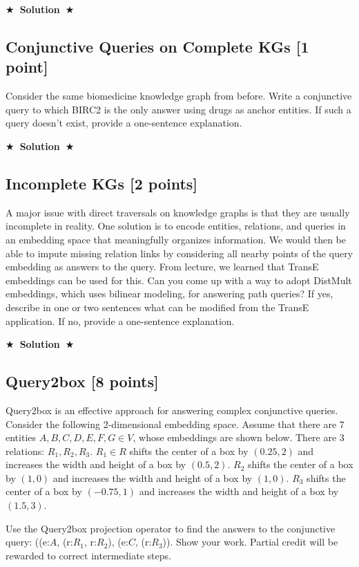 \documentclass[11pt]{article}
\numberwithin{figure}{section}
\newcommand{\Solution}[1]{{\medskip \color{red} \bf $\bigstar$~\sf \textbf{Solution}~$\bigstar$ \sf #1 } \bigskip}
\begin{document}
\Solution{}


\subsection{Conjunctive Queries on Complete KGs [1 point]}
Consider the same biomedicine knowledge graph from before. Write a conjunctive query to which BIRC2 is the only answer using drugs as anchor entities. If such a query doesn't exist, provide a one-sentence explanation.

\Solution{}


\subsection{Incomplete KGs [2 points]}
A major issue with direct traversals on knowledge graphs is that they are usually incomplete in reality. One solution is to encode entities, relations, and queries in an embedding space that meaningfully organizes information. We would then be able to impute missing relation links by considering all nearby points of the query embedding as answers to the query. From lecture, we learned that TransE embeddings can be used for this. Can you come up with a way to adopt DistMult embeddings, which uses bilinear modeling, for answering path queries? If yes, describe in one or two sentences what can be modified from the TransE application. If no, provide a one-sentence explanation.

\Solution{}


\subsection{Query2box [8 points]}

Query2box is an effective approach for answering complex conjunctive queries. Consider the following 2-dimensional embedding space. Assume that there are 7 entities $A, B, C, D, E, F, G \in V$, whose embeddings are shown below. There are 3 relations: $R_1, R_2, R_3$. $R_1 \in R$ shifts the center of a box by $(0.25, 2)$ and increases the width and height of a box by $(0.5, 2)$. $R_2$ shifts the center of a box by $(1, 0)$ and increases the width and height of a box by $(1, 0)$. $R_3$ shifts the center of a box by $(-0.75, 1)$ and increases the width and height of a box by $(1.5, 3)$.

Use the Query2box projection operator to find the answers to the conjunctive query: ((e:$A$, (r:$R_1$, r:$R_2$), (e:$C$, (r:$R_3$)). Show your work. Partial credit will be rewarded to correct intermediate steps.
\end{document}

